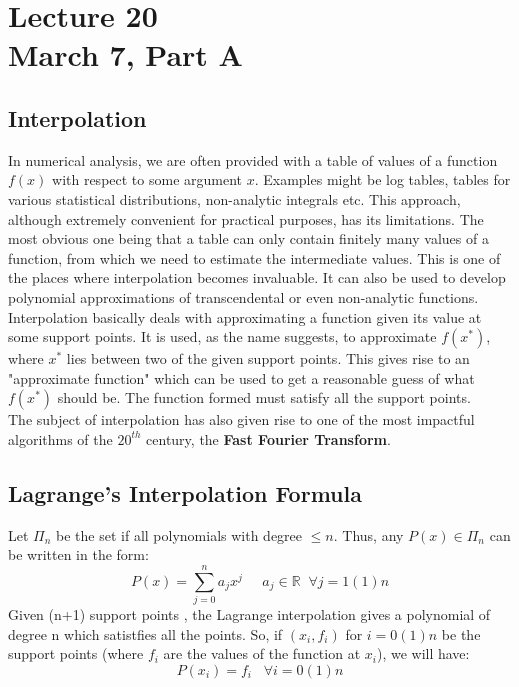 \chapter*{Lecture 20\\March 7, Part A}
\setcounter{chapter}{20}


\setcounter{section}{0}

\section{Interpolation}

In numerical analysis, we are often provided with a table of values of a function $f(x)$ with respect to some argument $x$. Examples might be log tables, tables for various statistical distributions, non-analytic integrals etc. This approach, although extremely convenient for practical purposes, has its limitations. The most obvious one being that a table can only contain finitely many values of a function, from which we need to estimate the intermediate values. This is one of the places where interpolation becomes invaluable. It can also be used to develop polynomial approximations of transcendental or even non-analytic functions.\\
Interpolation basically deals with approximating a function given its value at some support points. It is used, as the name suggests, to approximate $f(x^*)$, where $x^*$ lies between two of the given support points. This gives rise to an "approximate function" which can be used to get a reasonable guess of what $f(x^*)$ should be. The function formed must satisfy all the support points.\\
The subject of interpolation has also given rise to one of the most impactful algorithms of the $20^{th}$ century, the \textbf{Fast Fourier Transform}.

\section{Lagrange's Interpolation Formula}

Let $\Pi_n$ be the set if all polynomials with degree $\leq n$. Thus, any $P(x) \in \Pi_n$ can be written in the form:
$$P(x) = \sum_{j = 0}^n a_j x^j\;\;\;\;\;a_j \in \mathbb{R}\;\;\forall j= 1(1)n$$
Given (n+1) support points , the Lagrange interpolation gives a polynomial of degree n which satistfies all the points. So, if $(x_i,f_i)$ for $i = 0(1)n$ be the support points (where $f_i$ are the values of the function at $x_i$), we will have:
$$P(x_i) = f_i    \;\;\; \forall i = 0(1)n$$

